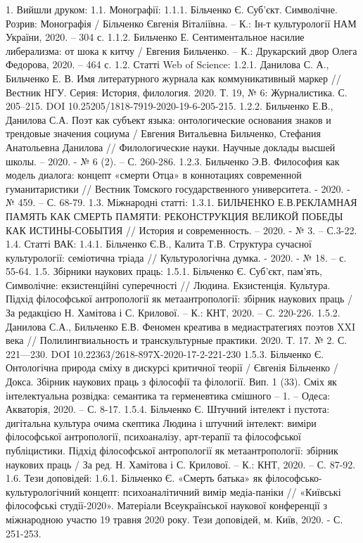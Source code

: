 1. Вийшли друком:
1.1. Монографії: 
1.1.1. Більченко Є. Суб’єкт. Символічне. Розрив: Монографія / Більченко Євгенія Віталіївна. – К.: Ін-т культурології НАМ України, 2020. – 304 с.
1.1.2. Бильченко Е. Сентиментальное насилие либерализма: от шока к китчу / Евгения Бильченко. – К.: Друкарский двор Олега Федорова, 2020. – 464 с. 
1.2. Статті Web of Science:
1.2.1. Данилова С. А., Бильченко Е. В. Имя литературного журнала как коммуникативный маркер // Вестник НГУ. Серия: История, филология. 2020. Т. 19, № 6: Журналистика. С. 205–215. DOI 10.25205/1818-7919-2020-19-6-205-215.
1.2.2. Бильченко Е.В., Данилова С.А. Поэт как субъект языка: онтологические основания знаков и трендовые значения социума / Евгения Витальевна Бильченко, Стефания Анатольевна Данилова // Филологические науки. Научные доклады высшей школы. – 2020. - № 6 (2). – С. 260-286.
1.2.3. Бильченко Э.В. Философия как модель диалога: концепт «смерти Отца» в коннотациях современной гуманитаристики // Вестник Томского государственного университета. - 2020. - № 459. – С.  68-79.
1.3. Міжнародні статті:
1.3.1. БИЛЬЧЕНКО Е.В.РЕКЛАМНАЯ ПАМЯТЬ КАК СМЕРТЬ
ПАМЯТИ: РЕКОНСТРУКЦИЯ ВЕЛИКОЙ ПОБЕДЫ КАК ИСТИНЫ-СОБЫТИЯ // История и современность. – 2020. - № 3. – С.3-22. 
1.4. Статті ВАК:
1.4.1. Більченко Є.В., Калита Т.В.  Структура сучасної культурології: семіотична тріада  // Культурологічна думка. - 2020. - № 18. – с. 55-64.
1.5. Збірники наукових праць:
1.5.1. Більченко Є. Суб’єкт, пам’ять, Символічне: екзистенційні суперечності // Людина. Екзистенція. Культура. Підхід філософської антропології як метаантропології: збірник наукових праць / За редакцією Н. Хамітова і С. Крилової. – К.: КНТ, 2020. – С. 220-226.
1.5.2. Данилова С.А., Бильченко Е.В. Феномен креатива в медиастратегиях поэтов XXI века // Полилингвиальность и транскультурные практики. 2020. Т. 17. № 2. С. 221—230. DOI 10.22363/2618-897X-2020-17-2-221-230
1.5.3. Більченко Є. Онтологічна природа сміху в дискурсі критичної теорії / Євгенія Більченко / Докса. Збірник наукових праць з філософії та філології. Вип. 1 (33). Сміх як інтелектуальна розвідка: семантика та герменевтика смішного – 1. – Одеса: Акваторія, 2020. – С. 8-17.
1.5.4. Більченко Є. Штучний інтелект і пустота: дигітальна культура очима скептика Людина і штучний інтелект: виміри філософської антропології, психоаналізу, арт-терапії та філософської публіцистики. Підхід філософської антропології як метаантропології: збірник наукових праць / За ред. Н. Хамітова і С. Крилової. – К.: КНТ, 2020. – С. 87-92. 
1.6. Тези доповідей:
1.6.1. Більченко Є. «Смерть батька» як філософсько-культурологічний концепт: психоаналітичний вимір медіа-паніки // «Київські філософські студії-2020». Матеріали Всеукраїнської наукової конференції з міжнародною участю 19 травня 2020 року. Тези доповідей, м. Київ, 2020. - С. 251-253.
